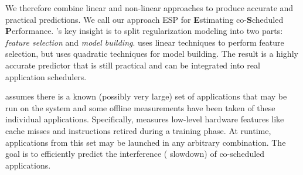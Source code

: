 We therefore combine linear and non-linear approaches to produce
accurate and practical predictions.  We call our approach ESP for
\textbf{E}stimating co-\textbf{S}cheduled \textbf{P}erformance.
\SYSTEM{}'s key insight is to split regularization modeling into two
parts: \emph{feature selection} and \emph{model building}.  \SYSTEM{}
uses linear techniques to perform feature selection, but uses
quadratic techniques for model building.  The result is a highly
accurate predictor that is still practical and can be integrated into
real application schedulers.

\SYSTEM{} assumes there is a known (possibly very large) set of
applications that may be run on the system and some offline
measurements have been taken of these individual applications.
Specifically, \SYSTEM{} measures low-level hardware features like
cache misses and instructions retired during a training phase.  At
runtime, applications from this set may be launched in any arbitrary
combination.  The goal is to efficiently predict the interference (\ie
slowdown) of co-scheduled applications.

